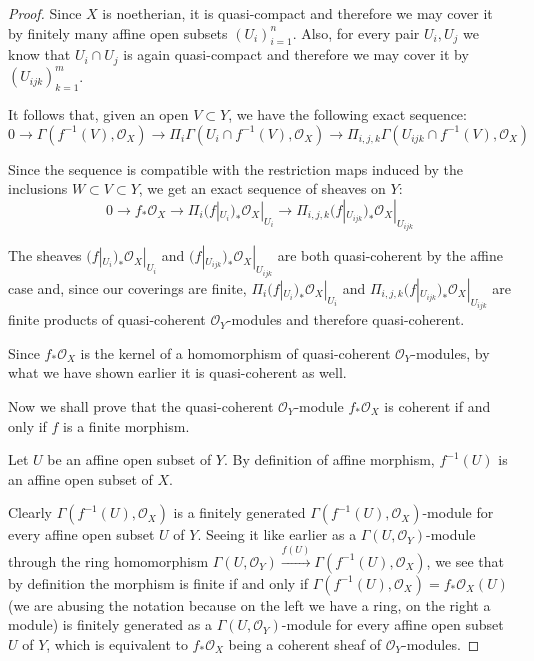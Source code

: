 \documentclass{article}
\begin{document}
\begin{proof}
    Since $X$ is noetherian, it is quasi-compact and therefore we may cover
    it by finitely many affine open subsets $(U_i)_{i=1}^n$. Also, for every
    pair $U_i,U_j$ we know that $U_i\cap U_j$ is again quasi-compact and
    therefore we may cover it by $(U_{ijk})_{k=1}^m$.

    It follows that, given an open $V\subset Y$, we have the following exact
    sequence:$$0\rightarrow\Gamma(f^{-1}(V),\mathcal{O}_X)\rightarrow\Pi_i
    \Gamma(U_i\cap f^{-1}(V),\mathcal{O}_X)\rightarrow\Pi_{i,j,k}
    \Gamma(U_{ijk}\cap f^{-1}(V),\mathcal{O}_X)$$

    Since the sequence is compatible with the restriction maps induced by
    the inclusions $W\subset V\subset Y$, we get an exact sequence of
    sheaves on $Y$:$$0\rightarrow f_*\mathcal{O}_X\rightarrow\Pi_i
    (f|_{U_i})_*\mathcal{O}_X|_{U_i}\rightarrow\Pi_{i,j,k}(f|_{U_{ijk}})_*
    \mathcal{O}_X|_{U_{ijk}}$$
	
    The sheaves $(f|_{U_i})_*\mathcal{O}_X|_{U_i}$ and
    $(f|_{U_{ijk}})_*\mathcal{O}_X|_{U_{ijk}}$ are both quasi-coherent by
    the affine case and, since our coverings are finite,
    $\Pi_i (f|_{U_i})_*\mathcal{O}_X|_{U_i}$ and
    $\Pi_{i,j,k}(f|_{U_{ijk}})_*\mathcal{O}_X|_{U_{ijk}}$ are
    finite products of quasi-coherent $\mathcal{O}_Y$-modules and therefore
    quasi-coherent.

    Since $f_*\mathcal{O}_X$ is the kernel of a homomorphism of
    quasi-coherent $\mathcal{O}_Y$-modules, by what we have shown earlier it
    is quasi-coherent as well.

    Now we shall prove that the quasi-coherent $\mathcal{O}_Y$-module
    $f_*\mathcal{O}_X$ is coherent if and only if $f$ is a finite morphism.
	
    Let $U$ be an affine open subset of $Y$. By definition of affine
    morphism, $f^{-1}(U)$ is an affine open subset of $X$.
	
    Clearly $\Gamma(f^{-1}(U),\mathcal{O}_X)$ is a finitely generated
    $\Gamma(f^{-1}(U),\mathcal{O}_X)$-module for every affine open subset
    $U$ of $Y$. Seeing it like earlier as a $\Gamma(U,\mathcal{O}_Y)$-module
    through the ring homomorphism
    $\Gamma(U,\mathcal{O}_Y)\xrightarrow{f(U)}\Gamma(f^{-1}(U),
    \mathcal{O}_X)$, we see that by definition the morphism is finite if and
    only if $\Gamma(f^{-1}(U),\mathcal{O}_X)=f_*\mathcal{O}_X(U)$ (we are
    abusing the notation because on the left we have a ring, on the right a
    module) is finitely generated as a $\Gamma(U,\mathcal{O}_Y)$-module for
    every affine open subset $U$ of $Y$, which is equivalent to
    $f_*\mathcal{O}_X$ being a coherent sheaf of $\mathcal{O}_Y$-modules.
\end{proof}
\end{document}
